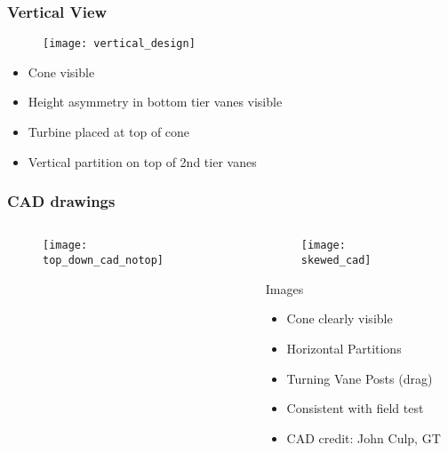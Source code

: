 \documentclass[mathserif]{beamer}
\begin{document}
%
%
%
\begin{frame}
 \frametitle{Vertical View}
    \begin{figure}[htb]
     \centering
     \texttt{[image: vertical\_design]}
    \end{figure}
 
 \begin{block}{}
  \begin{itemize}
   \item Cone visible
   \item Height asymmetry in bottom tier vanes visible
   \item Turbine placed at top of cone
   \item Vertical partition on top of 2nd tier vanes 
  \end{itemize}
 \end{block}
\end{frame}

%
%
%
\begin{frame}
 \frametitle{CAD drawings}

 \begin{columns}[]
  \begin{column}{0.55\linewidth}

    \begin{figure}[htb]
     \centering
     \texttt{[image: top\_down\_cad\_notop]}
    \end{figure}

  \end{column}
   \begin{column}{0.45\linewidth}

    \begin{figure}[htb]
     \centering
     \texttt{[image: skewed\_cad]}
    \end{figure}

    \begin{block}{Images}
     \begin{itemize}
      \item Cone clearly visible
      \item Horizontal Partitions
      \item Turning Vane Posts (drag)
      \item Consistent with field test 
      \item CAD credit: John Culp, GT
     \end{itemize}
     \end{block}

   \end{column}
 \end{columns}

\end{frame}
\end{document}
